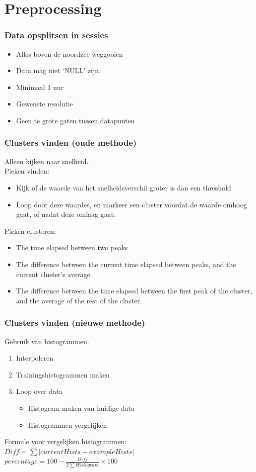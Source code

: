 \documentclass{beamer}
\newcommand{\slide}[2]
{
\begin{frame}
\frametitle{#1} 

#2

\end{frame}
}
\begin{document}
\section{Preprocessing}
\slide{Data opsplitsen in sessies}
{
\begin{itemize}
    \item Alles boven de noordzee weggooien
    \item Data mag niet `NULL' zijn.
    \item Minimaal 1 uur
    \item Gewenste resolutie
    \item Geen te grote gaten tussen datapunten
\end{itemize}
}

\slide{Clusters vinden (oude methode)}
{
     Alleen kijken naar snelheid.\\
     Pieken vinden:
 \begin{itemize}
    \item Kijk of de waarde van het snelheidsverschil groter is dan een
    threshold
    \item Loop door deze waardes, en markeer een cluster voordat de waarde omhoog
    gaat, of nadat deze omlaag gaat.
 \end{itemize}
    Pieken clusteren:
    \begin{itemize}
 \item The time elapsed between two peaks
 \item The difference between the current time elapsed between peaks, and the
 current cluster's average
 \item The difference between the time elapsed between the first peak of the
 cluster, and the average of the rest of the cluster.
 \end{itemize}

}


\slide{Clusters vinden (nieuwe methode)}
{
    Gebruik van histogrammen.
\begin{enumerate}
    \item Interpoleren
    \item Trainingshistogrammen maken
    \item Loop over data
    \begin{itemize}
        \item Histogram maken van huidige data
        \item Histogrammen vergelijken
    \end{itemize}
\end{enumerate}

Formule voor vergelijken histogrammen:\\
\hspace{.5cm} $Diff =  \sum \left| currentHists - exampleHists
\right|$\\
\hspace{.5cm} $percentage = 100 - \frac{Diff}{2 \sum Histogram} \times 100$
}
\end{document}
